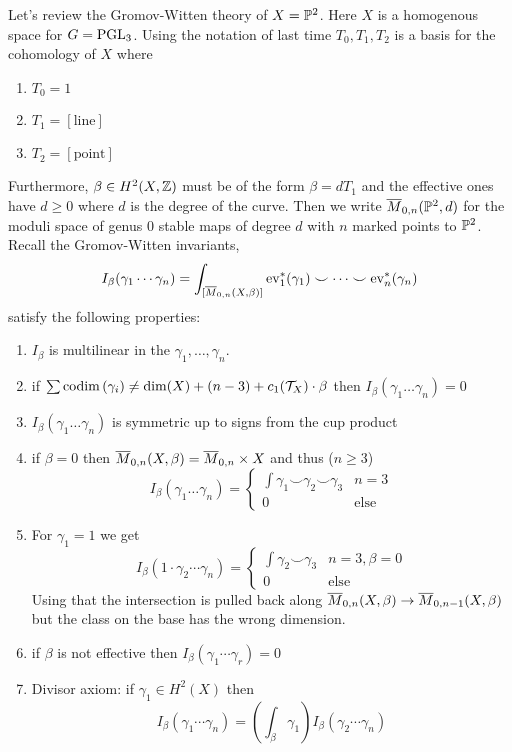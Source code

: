 \documentclass[12pt]{article}
\begin{document}
Let's review the Gromov-Witten theory of $X = \P^2$. Here $X$ is a homogenous space for $G = \PGL_3$. Using the notation of last time $T_0, T_1, T_2$ is a basis for the cohomology of $X$ where
\begin{enumerate}
\item $T_0 = 1$
\item $T_1 = [\text{line}]$
\item $T_2 = [\text{point}]$
\end{enumerate}
Furthermore, $\beta \in H^2(X, \Z)$ must be of the form $\beta = d T_1$ and the effective ones have $d \ge 0$ where $d$ is the degree of the curve. Then we write $\ol{M}_{0,n}(\P^2, d)$ for the moduli space of genus $0$ stable maps of degree $d$ with $n$ marked points to $\P^2$.
\bigskip\\
Recall the Gromov-Witten invariants,
\[ I_\beta(\gamma_1 \cdots \gamma_n) = \int_{[\ol{M}_{0,n}(X, \beta)]} \ev_1^{*}(\gamma_1) \smile \cdots \smile \ev_n^*(\gamma_n) \]
satisfy the following properties:
\begin{enumerate}
\item $I_\beta$ is multilinear in the $\gamma_1, \dots, \gamma_n$.
\item if $\sum \codim{\gamma_i} \neq \dim(X) + (n-3) + c_1(\T_X) \cdot \beta$ then $I_\beta(\gamma_1 \dots \gamma_n) = 0$
\item $I_\beta(\gamma_1 \dots \gamma_n)$ is symmetric up to signs from the cup product
\item if $\beta = 0$ then $\ol{M}_{0,n}(X, \beta) = \ol{M}_{0,n} \times X$ and thus ($n \ge 3$)
\[ I_\beta(\gamma_1 \dots \gamma_n) = 
\begin{cases}
\int \gamma_1 \smile  \gamma_2 \smile \gamma_3 & n = 3
\\
0 & \text{else}
\end{cases} \] 
\item For $\gamma_1 = 1$ we get
\[ I_\beta(1 \cdot \gamma_2 \cdots \gamma_n) = 
\begin{cases}
\int \gamma_2 \smile \gamma_3 & n = 3, \beta = 0
\\
0 & \text{else}
\end{cases} \]
Using that the intersection is pulled back along $\ol{M}_{0, n}(X, \beta) \to \ol{M}_{0,n-1}(X, \beta)$ but the class on the base has the wrong dimension. 
\item if $\beta$ is not effective then $I_\beta(\gamma_1 \cdots \gamma_r) = 0$
\item Divisor axiom: if $\gamma_1 \in H^2(X)$ then
\[ I_\beta(\gamma_1 \cdots \gamma_n) = \left( \int_\beta \gamma_1 \right) I_\beta(\gamma_2 \cdots \gamma_n) \] 
\end{enumerate}
\end{document}
